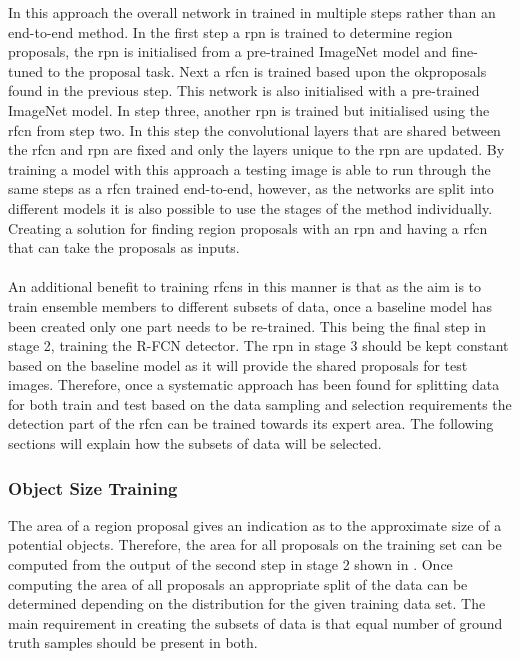 In this approach the overall network in trained in multiple steps rather than an end-to-end method. In the first step a \gls{rpn} is trained to determine region proposals, the \gls{rpn} is initialised from a pre-trained ImageNet model and fine-tuned to the proposal task. Next a \gls{rfcn} is trained based upon the okproposals found in the previous step. This network is also initialised with a pre-trained ImageNet model. In step three, another \gls{rpn} is trained but initialised using the \gls{rfcn} from step two. In this step the convolutional layers that are shared between the \gls{rfcn} and \gls{rpn} are fixed and only the layers unique to the \gls{rpn} are updated. By training a model with this approach a testing image is able to run through the same steps as a \gls{rfcn} trained end-to-end, however, as the networks are split into different models it is also possible to use the stages of the method individually. Creating a solution for finding region proposals with an \gls{rpn} and having a \gls{rfcn} that can take the proposals as inputs. 
\\\\
An additional benefit to training \glspl{rfcn} in this manner is that as the aim is to train ensemble members to different subsets of data, once a baseline model has been created only one part needs to be re-trained. This being the final step in stage 2, training the R-FCN detector. The \gls{rpn} in stage 3 should be kept constant based on the baseline model as it will provide the shared proposals for test images. Therefore, once a systematic approach has been found for splitting data for both train and test based on the data sampling and selection requirements the detection part of the \gls{rfcn} can be trained towards its expert area. The following sections will explain how the subsets of data will be selected.

\subsubsection{Object Size Training}
The area of a region proposal gives an indication as to the approximate size of a potential objects. Therefore, the area for all proposals on the training set can be computed from the output of the second step in stage 2 shown in . Once computing the area of all proposals an appropriate split of the data can be determined depending on the distribution for the given training data set. The main requirement in creating the subsets of data is that equal number of ground truth samples should be present in both.

